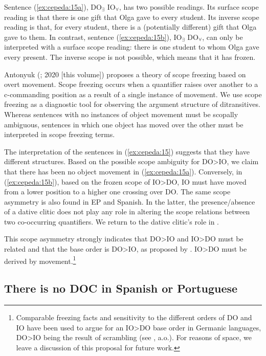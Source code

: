 \documentclass[output=paper,colorlinks,citecolor=brown,modfonts,nonflat]{langsci/langscibook}
\begin{document}
Sentence (\ref{ex:cepeda:15a}), DO$_∃$ IO$_∀$, has two possible readings. Its surface scope reading is that there is one gift that Olga gave to every student. Its inverse scope reading is that, for every student, there is a (potentially different) gift that Olga gave to them. In contrast, sentence (\ref{ex:cepeda:15b}), IO$_∃$  DO$_∀$, can only be interpreted with a surface scope reading: there is one student to whom Olga gave every present. The inverse scope is not possible, which means that it has frozen.

\nocite{chapters/antonyuk}
Antonyuk (\citeyear*{Antonyuk2015}; 2020 [this volume]) proposes a theory of scope freezing based on overt movement. Scope freezing occurs when a quantifier raises over another to a c-com\-man\-ding position as a result of a single instance of movement. We use scope freezing as a diagnostic tool for observing the argument structure of ditransitives. Whereas sentences with no instances of object movement must be scopally ambiguous, sentences in which one object has moved over the other must be interpreted in scope freezing terms.

The interpretation of the sentences in (\ref{ex:cepeda:15}) suggests that they have different structures. Based on the possible scope ambiguity for DO>IO, we claim that there has been no object movement in (\ref{ex:cepeda:15a}). Conversely, in (\ref{ex:cepeda:15b}), based on the frozen scope of IO>DO, IO must have moved from a lower position to a higher one crossing over DO. The same scope asymmetry is also found in EP and Spanish. In the latter, the presence/absence of a dative clitic does not play any role in altering the scope relations between two co-occurring quantifiers. We return to the dative clitic’s role in .

This scope asymmetry strongly indicates that DO>IO and IO>DO must be related and that the base order is DO>IO, as proposed by \citet{Larson1988,Larson2014}. IO>DO must be derived by movement.\footnote{Comparable freezing facts and sensitivity to the different orders of DO and IO have been used to argue for an IO>DO base order in Germanic languages, DO>IO being the result of scrambling (see \citealt{Abraham1986, Choi1996, Bacovcin2017}, a.o.). For reasons of space, we leave a discussion of this proposal for future work.}

\subsection{There is no DOC in Spanish or Portuguese}\label{sec:cepeda:2.2}
\end{document}
